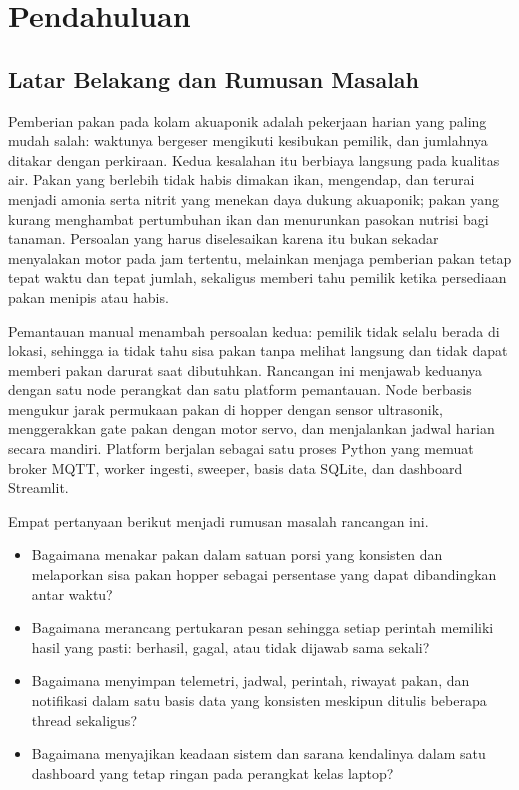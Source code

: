 \chapter{Pendahuluan}
\label{ch:01-pendahuluan}

\section{Latar Belakang dan Rumusan Masalah}

Pemberian pakan pada kolam akuaponik adalah pekerjaan harian yang paling mudah
salah: waktunya bergeser mengikuti kesibukan pemilik, dan jumlahnya ditakar dengan
perkiraan. Kedua kesalahan itu berbiaya langsung pada kualitas air. Pakan yang
berlebih tidak habis dimakan ikan, mengendap, dan terurai menjadi amonia serta
nitrit yang menekan daya dukung akuaponik; pakan yang kurang menghambat
pertumbuhan ikan dan menurunkan pasokan nutrisi bagi tanaman. Persoalan yang harus
diselesaikan karena itu bukan sekadar menyalakan motor pada jam tertentu,
melainkan menjaga pemberian pakan tetap tepat waktu dan tepat jumlah, sekaligus
memberi tahu pemilik ketika persediaan pakan menipis atau habis.

Pemantauan manual menambah persoalan kedua: pemilik tidak selalu berada di lokasi,
sehingga ia tidak tahu sisa pakan tanpa melihat langsung dan tidak dapat memberi
pakan darurat saat dibutuhkan. Rancangan ini menjawab keduanya dengan satu node
perangkat dan satu platform pemantauan. Node berbasis \BoardName{} mengukur jarak
permukaan pakan di hopper dengan sensor ultrasonik, menggerakkan gate pakan dengan
motor servo, dan menjalankan jadwal harian secara mandiri. Platform berjalan
sebagai satu proses Python yang memuat broker MQTT, worker ingesti, sweeper, basis
data SQLite, dan dashboard Streamlit.

Empat pertanyaan berikut menjadi rumusan masalah rancangan ini.
\begin{itemize}[leftmargin=*,itemsep=2pt]
  \item Bagaimana menakar pakan dalam satuan porsi yang konsisten dan melaporkan
        sisa pakan hopper sebagai persentase yang dapat dibandingkan antar waktu?
  \item Bagaimana merancang pertukaran pesan sehingga setiap perintah memiliki
        hasil yang pasti: berhasil, gagal, atau tidak dijawab sama sekali?
  \item Bagaimana menyimpan telemetri, jadwal, perintah, riwayat pakan, dan
        notifikasi dalam satu basis data yang konsisten meskipun ditulis beberapa
        thread sekaligus?
  \item Bagaimana menyajikan keadaan sistem dan sarana kendalinya dalam satu
        dashboard yang tetap ringan pada perangkat kelas laptop?
\end{itemize}

